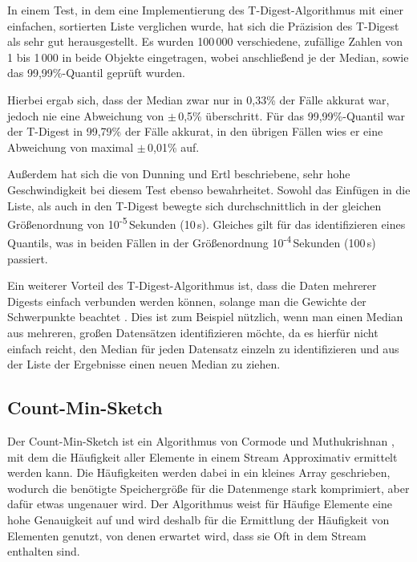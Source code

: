 In einem Test, in dem eine Implementierung des T-Digest-Algorithmus mit einer einfachen, sortierten Liste verglichen wurde, hat sich die Präzision des T-Digest als sehr gut herausgestellt.
Es wurden 100\,000 verschiedene, zufällige Zahlen von 1 bis 1\,000 in beide Objekte eingetragen, wobei anschließend je der Median, sowie das 99,99\%-Quantil geprüft wurden.

Hierbei ergab sich, dass der Median zwar nur in 0,33\% der Fälle akkurat war, jedoch nie eine Abweichung von $\pm$\,0,5\% überschritt.
Für das 99,99\%-Quantil war der T-Digest in 99,79\% der Fälle akkurat, in den übrigen Fällen wies er eine Abweichung von maximal $\pm$\,0,01\% auf.

Außerdem hat sich die von Dunning und Ertl \cite{dunning2019} beschriebene, sehr hohe Geschwindigkeit bei diesem Test ebenso bewahrheitet.
Sowohl das Einfügen in die Liste, als auch in den T-Digest bewegte sich durchschnittlich in der gleichen Größenordnung von 10\textsuperscript{-5}\,Sekunden (10\,\textmu{}s).
Gleiches gilt für das identifizieren eines Quantils, was in beiden Fällen in der Größenordnung 10\textsuperscript{-4}\,Sekunden (100\,\textmu{}s) passiert.

Ein weiterer Vorteil des T-Digest-Algorithmus ist, dass die Daten mehrerer Digests einfach verbunden werden können, solange man die Gewichte der Schwerpunkte beachtet \cite{dunning2019}.
Dies ist zum Beispiel nützlich, wenn man einen Median aus mehreren, großen Datensätzen identifizieren möchte, da es hierfür nicht einfach reicht, den Median für jeden Datensatz einzeln zu identifizieren und aus der Liste der Ergebnisse einen neuen Median zu ziehen.


\subsection{Count-Min-Sketch}

Der Count-Min-Sketch ist ein Algorithmus von Cormode und Muthukrishnan \cite{cormode2003}, 
mit dem die Häufigkeit aller Elemente in einem Stream Approximativ ermittelt werden kann. 
Die Häufigkeiten werden dabei in ein kleines Array geschrieben, 
wodurch die benötigte Speichergröße für die Datenmenge stark komprimiert, 
aber dafür etwas ungenauer wird. 
Der Algorithmus weist für Häufige Elemente eine hohe Genauigkeit auf 
und wird deshalb für die Ermittlung der Häufigkeit von Elementen genutzt, 
von denen erwartet wird, dass sie Oft in dem Stream enthalten sind.

